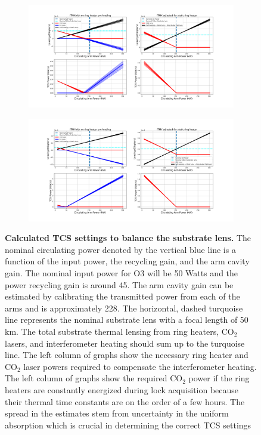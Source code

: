 	\begin{figure}[!]
		\centering
		\begin{subfigure}[b]{1.0\textwidth}
			\centering
			\includegraphics[width=\textwidth]{../Figures/ITMX_TCS_Settings.png}
			\label{fig:TCS_ITMX}
		\end{subfigure}
		\hfill
		\begin{subfigure}[b]{1.0\textwidth}
			\centering
			\includegraphics[width=\textwidth]{../Figures/ITMY_TCS_Settings.png}
			\label{fig:TCS_ITMY}
		\end{subfigure}
		\caption[Calculated TCS settings to balance the substrate lens.]{
			\textbf{Calculated TCS settings to balance the substrate lens.}  The nominal circulating power denoted by the vertical blue line is a function of the input power, the recycling gain, and the arm cavity gain.  The nominal input power for O3 will be 50 Watts and the power recycling gain is around 45.  The arm cavity gain can be estimated by calibrating the transmitted power from each of the arms and is approximately 228.  The horizontal, dashed turquoise line represents the nominal substrate lens with a focal length of 50 km.  The total substrate thermal lensing from ring heaters, CO$_2$ lasers, and interferometer heating should sum up to the turquoise line.  The left column of graphs show the necessary ring heater and CO$_2$ laser powers required to compensate the interferometer heating. The left column of graphs show the required CO$_2$ power if the ring heaters are constantly energized during lock acquisition because their thermal time constants are on the order of a few hours.  The spread in the estimates stem from uncertainty in the uniform absorption which is crucial in determining the correct TCS settings
		}
		\label{fig:TCS_ITMs}
	\end{figure}
	
